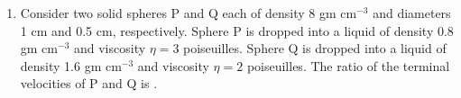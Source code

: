 
\begin{enumerate}
    \item Consider two solid spheres P and Q each of density 8 gm cm$^{-3}$ and diameters 1 cm and 0.5 cm, respectively. Sphere P is dropped into a liquid of density 0.8 gm cm$^{-3}$ and viscosity $\eta=3$ poiseuilles. Sphere Q is dropped into a liquid of density 1.6 gm cm$^{-3}$ and viscosity $\eta=2$ poiseuilles. The ratio of the terminal velocities of P and Q is \underline{\hspace{2.5 cm}}.
\end{enumerate}
